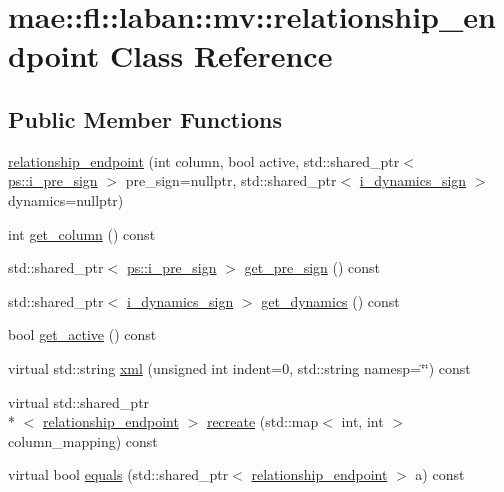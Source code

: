 \hypertarget{classmae_1_1fl_1_1laban_1_1mv_1_1relationship__endpoint}{\section{mae\-:\-:fl\-:\-:laban\-:\-:mv\-:\-:relationship\-\_\-endpoint Class Reference}
\label{classmae_1_1fl_1_1laban_1_1mv_1_1relationship__endpoint}
}
\subsection*{Public Member Functions}
\begin{DoxyCompactItemize}
\item 
\hyperlink{classmae_1_1fl_1_1laban_1_1mv_1_1relationship__endpoint_a9b31b948e9fb840661903c204ca66a64}{relationship\-\_\-endpoint} (int column, bool active, std\-::shared\-\_\-ptr$<$ \hyperlink{classmae_1_1fl_1_1laban_1_1ps_1_1i__pre__sign}{ps\-::i\-\_\-pre\-\_\-sign} $>$ pre\-\_\-sign=nullptr, std\-::shared\-\_\-ptr$<$ \hyperlink{classmae_1_1fl_1_1laban_1_1mv_1_1i__dynamics__sign}{i\-\_\-dynamics\-\_\-sign} $>$ dynamics=nullptr)
\item 
int \hyperlink{classmae_1_1fl_1_1laban_1_1mv_1_1relationship__endpoint_a6a5c40f2e3dd1958746e4bd270dcfaaa}{get\-\_\-column} () const 
\item 
std\-::shared\-\_\-ptr$<$ \hyperlink{classmae_1_1fl_1_1laban_1_1ps_1_1i__pre__sign}{ps\-::i\-\_\-pre\-\_\-sign} $>$ \hyperlink{classmae_1_1fl_1_1laban_1_1mv_1_1relationship__endpoint_a7a74292855521a313350c9b6275f5359}{get\-\_\-pre\-\_\-sign} () const 
\item 
std\-::shared\-\_\-ptr$<$ \hyperlink{classmae_1_1fl_1_1laban_1_1mv_1_1i__dynamics__sign}{i\-\_\-dynamics\-\_\-sign} $>$ \hyperlink{classmae_1_1fl_1_1laban_1_1mv_1_1relationship__endpoint_a0603b9d011cc510bd580ee3fdbdc73b0}{get\-\_\-dynamics} () const 
\item 
bool \hyperlink{classmae_1_1fl_1_1laban_1_1mv_1_1relationship__endpoint_a8b433cd7e554c39d80db0859b02cb035}{get\-\_\-active} () const 
\item 
virtual std\-::string \hyperlink{classmae_1_1fl_1_1laban_1_1mv_1_1relationship__endpoint_a2ef2cb10dbc0526ea825f30837ae7ee2}{xml} (unsigned int indent=0, std\-::string namesp=\char`\"{}\char`\"{}) const 
\item 
virtual std\-::shared\-\_\-ptr\\*
$<$ \hyperlink{classmae_1_1fl_1_1laban_1_1mv_1_1relationship__endpoint}{relationship\-\_\-endpoint} $>$ \hyperlink{classmae_1_1fl_1_1laban_1_1mv_1_1relationship__endpoint_a3f091e5172040c86ec4fc7e18570426b}{recreate} (std\-::map$<$ int, int $>$ column\-\_\-mapping) const 
\item 
virtual bool \hyperlink{classmae_1_1fl_1_1laban_1_1mv_1_1relationship__endpoint_a046002ba3bdff9a33ec5497b4987f655}{equals} (std\-::shared\-\_\-ptr$<$ \hyperlink{classmae_1_1fl_1_1laban_1_1mv_1_1relationship__endpoint}{relationship\-\_\-endpoint} $>$ a) const 
\end{DoxyCompactItemize}


